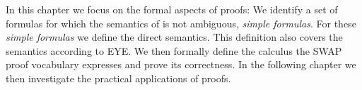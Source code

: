In this chapter we focus on the formal aspects of proofs:
We identify a set of formulas for which the semantics of \nthree is not ambiguous, \emph{simple formulas}.
For these \emph{simple formulas} we define the direct semantics. This definition also covers the semantics according to EYE.
We then formally define the calculus the SWAP proof vocabulary expresses and prove its correctness. 
In the following chapter we then investigate the practical applications of \nthree proofs.


% 





